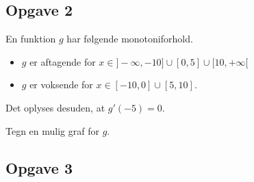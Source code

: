 \subsection*{Opgave 2}
En funktion $g$ har følgende monotoniforhold. 
\begin{itemize}
	\item[$\cdot$] $g$ er aftagende for $x \in ]-\infty,-10] \cup [0,5] \cup [10,+\infty[$
	\item[$\cdot$] $g$ er voksende for $x \in [-10,0] \cup [5,10]$.
\end{itemize}
Det oplyses desuden, at $g'(-5) = 0$. 

Tegn en mulig graf for $g$.

\subsection*{Opgave 3}

